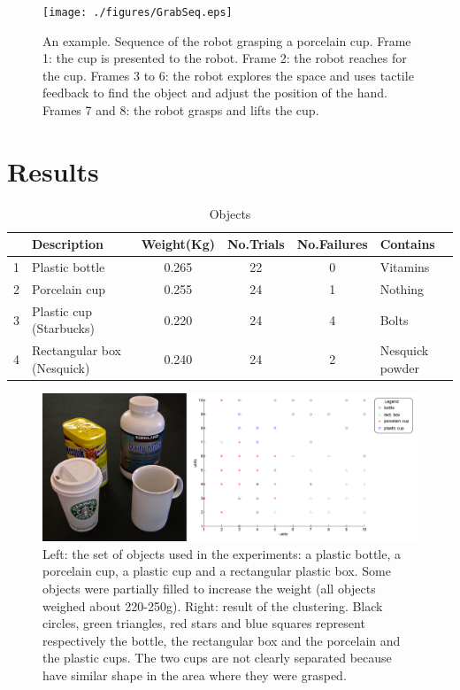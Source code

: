 \begin{figure}[tb]
\centerline{
\texttt{[image: ./figures/GrabSeq.eps]}
} \caption{An example. Sequence of the robot grasping a porcelain
cup. Frame 1: the cup is presented to the robot. Frame 2: the
robot reaches for the cup. Frames 3 to 6:  the robot explores the
space and uses tactile feedback to find the object and adjust the
position of the hand. Frames 7 and 8: the robot grasps
and lifts the cup.} \label{fig:sequence}
\end{figure}

\section{Results}
\label{sec:results}

\begin{table}[htb]
  \caption{Objects} \label{tab:objects} \centering
  \begin{tabular}{|c|l|c|c|c|l|}
    \hline
    &Description& Weight(Kg)&No.Trials&No.Failures&Contains \\
    \hline
    1&Plastic bottle        & 0.265 & 22& 0 & Vitamins\\
    2&Porcelain cup & 0.255 & 24& 1 & Nothing\\
    3&Plastic cup (Starbucks)      & 0.220 & 24& 4 & Bolts \\
    4&Rectangular box (Nesquick)        & 0.240 & 24& 2 & Nesquick powder\\

    \hline
  \end{tabular}
\end{table}

\begin{figure}[tbp]
\centerline{
\includegraphics[width=6.0in]{./figures/objects-clusters2.eps}
}\caption{Left: the set of objects used in the experiments: a plastic bottle,
a porcelain cup, a plastic cup and a rectangular plastic box. Some objects were
partially filled to increase the weight (all objects weighed about 220-250g).
Right: result of the clustering. Black circles, green
triangles, red stars and blue squares represent respectively the bottle,
the rectangular box and the porcelain and the plastic cups. The two cups are not
clearly separated because have similar shape in the area where they were grasped.}
\label{fig:Objects}
\end{figure}

